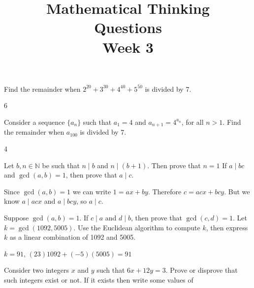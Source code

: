 \documentclass[12pt, answers, a4paper]{exam}
\title{\begin{framed}
    \textbf{Mathematical Thinking}\\Questions\\Week 3
\end{framed}}
\date{}
\begin{document}
\maketitle
\setlength{\rightpointsmargin}{5pt}
\marginpointname{ \points}
\pointsinrightmargin
\unframedsolutions

\begin{questions}
\question[1] Find the remainder when $2^{20} + 3^{30} + 4^{40} + 5^{50}$ is divided by 7.
\begin{solution}
    6
\end{solution}
\question[2] Consider a sequence $\{a_n\}$ such that $a_1 = 4$ and $a_{n+1} = 4^{a_n}$, for all $n > 1$. Find the remainder when $a_{100}$ is divided by 7.
\begin{solution}
    4
\end{solution}
\question[1]  Let $b, n \in \mathbb{N}$ be such that $n \mid b$ and $n\mid (b+1).$ Then prove that $n=1$
\question[2]  If $a\mid bc$ and $\gcd(a,b) = 1$, then prove that $a\mid c$.
\noprintanswers
\begin{solution}
Since $\gcd(a, b) = 1$ we can write $1 = ax + by$. Therefore $c = acx + bcy$. But we know $a\mid acx$ and $a\mid bcy$, so $a\mid c$.    
\end{solution}
\question[2] Suppose $\gcd(a,b) = 1$. If $c\mid a$ and $d\mid b$, then prove that $\gcd(c,d) = 1$.
\question[3] Let $k = \gcd(1092,5005).$ Use the Euclidean algorithm to compute $k$, then express $k$ as a linear combination of 1092 and 5005.
\printanswers
\begin{solution}
    $k =91$, $(23)1092 + (-5)(5005) = 91$
\end{solution}
\question Consider two integers $x$ and $y$ such that $6x+12y=3$. Prove or disprove that such integers exist or not. If it exists then  write some values of 
\end{questions}
\end{document}
